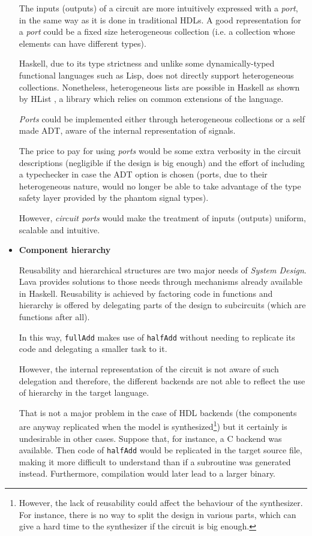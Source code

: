 \begin{itemize}
    The inputs (outputs) of a circuit are more intuitively expressed
    with a \textit{port}, in the same way as it is done in traditional
    HDLs. A good representation for a \textit{port} could be a fixed
    size heterogeneous collection (i.e. a collection whose elements
    can have different types).

    Haskell, due to its type strictness and unlike some
    dynamically-typed functional languages such as Lisp, does not
    directly support heterogeneous collections.  Nonetheless,
    heterogeneous lists are possible in Haskell as shown by
    HList \cite{hlist}, a library which relies on common extensions of
    the language.

    \textit{Ports} could be implemented either through heterogeneous
    collections or a self made ADT, aware of the internal
    representation of signals.
    
    The price to pay for using \textit{ports} would be some extra
    verbosity in the circuit descriptions (negligible if the design is
    big enough) and the effort of including a typechecker in case the
    ADT option is chosen (ports, due to their heterogeneous nature,
    would no longer be able to take advantage of the type safety layer
    provided by the phantom signal types).
    
    However, \textit{circuit ports} would make the treatment of inputs
    (outputs) uniform, scalable and intuitive.
    
  \item \textbf{Component hierarchy} 
    
    Reusability and hierarchical structures are two major needs of
    \textit{System Design}.
    Lava provides solutions to those needs through mechanisms already
    available in Haskell. Reusability is achieved by factoring code in
    functions and hierarchy is offered by delegating parts of the design to
    subcircuits (which are functions after all).
    
    In this way, \texttt{fullAdd} makes use of \texttt{halfAdd} without
    needing to replicate its code and delegating a smaller task to it.
    
    However, the internal representation of the circuit is not
    aware of such delegation and therefore, the different backends
    are not able to reflect the use of hierarchy in the target language.

    That is not a major problem in the case of HDL backends (the components
    are anyway replicated when the model is synthesized\footnote{However, the
      lack of reusability could affect the behaviour of the synthesizer. For
      instance, there is no way to split the design in various parts, which
      can give a hard time to the synthesizer if the circuit is big enough.})
    but it certainly is undesirable in other cases. Suppose that, for
    instance, a C backend was available. Then code of \texttt{halfAdd} would
    be replicated in the target source file, making it more difficult to
    understand than if a subroutine was generated instead.  Furthermore,
    compilation would later lead to a larger binary.


\end{itemize}
